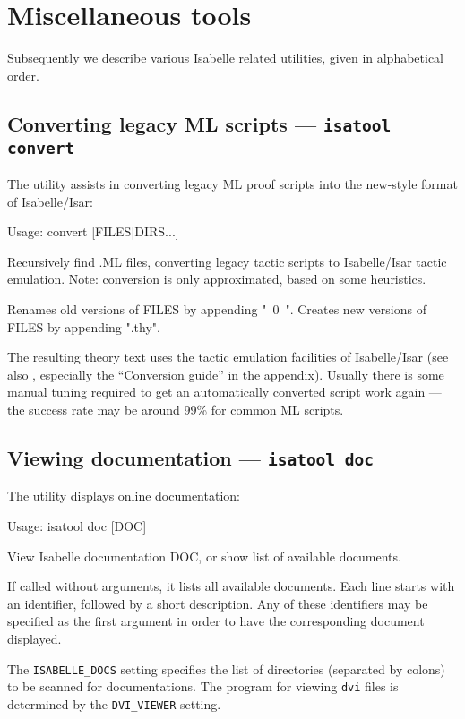 

\chapter{Miscellaneous tools} \label{ch:tools}

Subsequently we describe various Isabelle related utilities, given in
alphabetical order.


\section{Converting legacy ML scripts --- \texttt{isatool convert}}

The  utility assists in converting legacy ML proof scripts
into the new-style format of Isabelle/Isar:
\begin{ttbox}
Usage: convert [FILES|DIRS...]

  Recursively find .ML files, converting legacy tactic scripts to
  Isabelle/Isar tactic emulation.
  Note: conversion is only approximated, based on some heuristics.

  Renames old versions of FILES by appending "~0~".
  Creates new versions of FILES by appending ".thy".
\end{ttbox}
The resulting theory text uses the tactic emulation facilities of
Isabelle/Isar (see also \cite{isabelle-ref}, especially the ``Conversion
guide'' in the appendix).  Usually there is some manual tuning required to get
an automatically converted script work again --- the success rate may be
around 99\% for common ML scripts.


\section{Viewing documentation --- \texttt{isatool doc}} \label{sec:tool-doc}

The  utility displays online documentation:
\begin{ttbox}
Usage: isatool doc [DOC]

  View Isabelle documentation DOC, or show list of available documents.
\end{ttbox}
If called without arguments, it lists all available documents. Each line
starts with an identifier, followed by a short description. Any of these
identifiers may be specified as the first argument in order to have the
corresponding document displayed.

\medskip The \texttt{ISABELLE_DOCS} setting specifies the list of directories
(separated by colons) to be scanned for documentations.  The program for
viewing \texttt{dvi} files is determined by the \texttt{DVI_VIEWER} setting.


